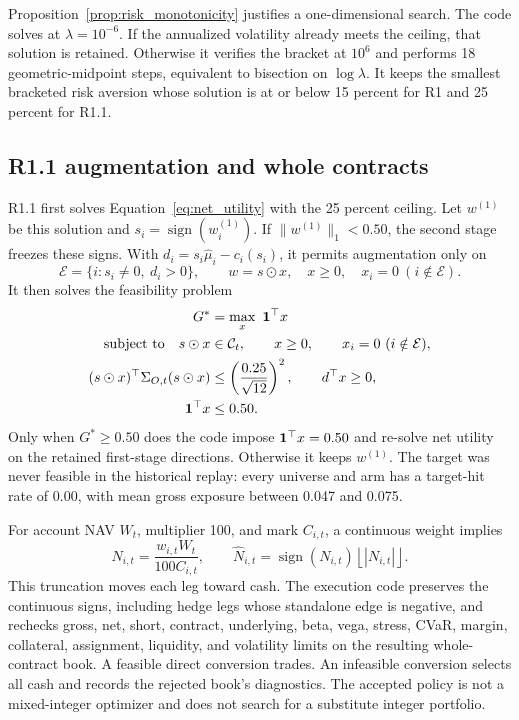 Proposition~\ref{prop:risk_monotonicity} justifies a one-dimensional search. The code
solves at \(\lambda=10^{-6}\). If the annualized volatility already meets the ceiling,
that solution is retained. Otherwise it verifies the bracket at \(10^6\) and performs
18 geometric-midpoint steps, equivalent to bisection on \(\log\lambda\). It keeps the
smallest bracketed risk aversion whose solution is at or below 15 percent for R1 and
25 percent for R1.1.

\subsection{R1.1 augmentation and whole contracts}

R1.1 first solves Equation~\eqref{eq:net_utility} with the 25 percent ceiling. Let
\(w^{(1)}\) be this solution and \(s_i=\operatorname{sign}(w_i^{(1)})\). If
\(\|w^{(1)}\|_1<0.50\), the second stage freezes these signs. With
\(d_i=s_i\widehat\mu_i-c_i(s_i)\), it permits augmentation only on
\begin{equation}
  \mathcal E=\{i:s_i\ne0,\ d_i>0\},
  \qquad w=s\odot x,\quad x\ge0,\quad x_i=0\ (i\notin\mathcal E).
  \label{eq:r11_directions}
\end{equation}
It then solves the feasibility problem
\begin{align}
  G^*&=\max_x\ \one^\top x \label{eq:r11_feasibility}\\
  \text{subject to}\quad
  s\odot x&\in\mathcal C_t,\qquad x\ge0,\qquad x_i=0\ (i\notin\mathcal E), \nonumber\\
  (s\odot x)^\top\Sigma_{O,t}(s\odot x)
  &\le\left(\frac{0.25}{\sqrt{12}}\right)^2,\qquad d^\top x\ge0, \nonumber\\
  \one^\top x&\le0.50. \nonumber
\end{align}
Only when \(G^*\ge0.50\) does the code impose \(\mathbf{1}^\top x=0.50\) and re-solve net
utility on the retained first-stage directions. Otherwise it keeps \(w^{(1)}\). The target
was never feasible in the historical replay: every universe and arm has a target-hit rate
of 0.00, with mean gross exposure between 0.047 and 0.075.

For account NAV \(W_t\), multiplier 100, and mark \(C_{i,t}\), a continuous weight implies
\begin{equation}
  N_{i,t}=\frac{w_{i,t}W_t}{100C_{i,t}},
  \qquad
  \widehat N_{i,t}=\operatorname{sign}(N_{i,t})
  \left\lfloor|N_{i,t}|\right\rfloor.
  \label{eq:integer_conversion}
\end{equation}
This truncation moves each leg toward cash. The execution code preserves the continuous
signs, including hedge legs whose standalone edge is negative, and rechecks gross, net,
short, contract, underlying, beta, vega, stress, CVaR, margin, collateral, assignment,
liquidity, and volatility limits on the resulting whole-contract book. A feasible direct
conversion trades. An infeasible conversion selects all cash and records the rejected
book's diagnostics. The accepted policy is not a mixed-integer optimizer and does not
search for a substitute integer portfolio.

